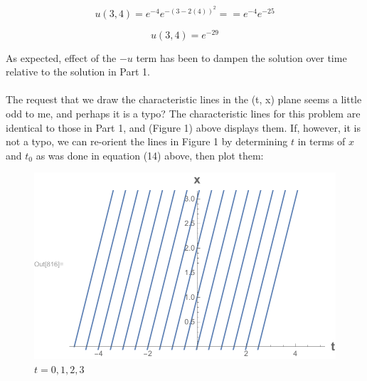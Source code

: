 \documentclass{article}
\begin{document}
\begin{equation}
u(3, 4) = e^{-4}e^{-(3-2(4))^2}= = e^{-4}e^{-25}
\end{equation}
\begin{tcolorbox}[minipage,colback=white,arc=0pt,outer arc=0pt]
\begin{equation}
u(3,4) = e^{-29}
\end{equation}
\end{tcolorbox}
As expected, effect of the $-u$ term has been to dampen the solution over time relative to the solution in Part 1.\\
\\
The request that we draw the characteristic lines in the (t, x) plane seems a little odd to me, and perhaps it is a typo? The characteristic lines for this problem are identical to those in Part 1, and (Figure 1) above displays them. If, however, it is not a typo, we can re-orient the lines in Figure 1 by determining $t$ in terms of $x$ and $t_0$ as was done in equation (14) above, then plot them:
\begin{figure}[H]
  \centering
    \includegraphics[width=\textwidth]{hw_12_plot3.pdf}
    \caption{$t = 0, 1, 2, 3$}
\end{figure}
\end{document}
